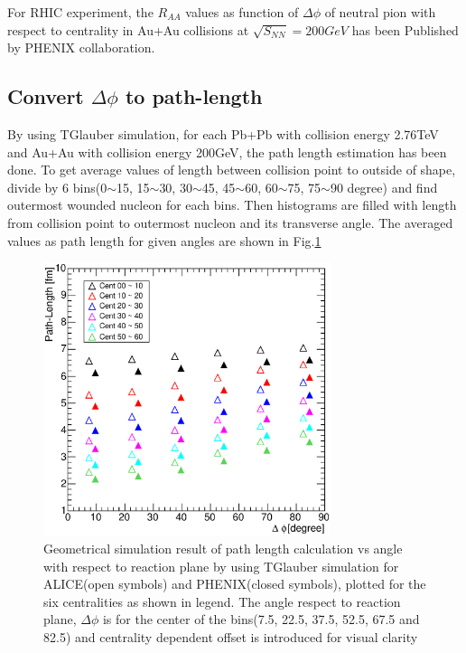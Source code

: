 For RHIC experiment, the $R_{AA}$ values as function of $\Delta \phi$ of neutral pion with respect to centrality in Au+Au collisions at $\sqrt{S_{NN}}= 200GeV$ has been Published by PHENIX collaboration. \cite{Adare:2012wg}


	\subsection{Convert $\Delta\phi$ to path-length}
	By using TGlauber simulation\cite{Alver:2008aq}, for each Pb+Pb with collision energy 2.76TeV and Au+Au with collision energy 200GeV, the path length estimation has been done. To get average values of length between collision point to outside of shape, divide by 6 bins(0$\sim$15, 15$\sim$30, 30$\sim$45, 45$\sim$60, 60$\sim$75, 75$\sim$90 degree) and find outermost wounded nucleon for each bins. Then histograms are filled with length from collision point to outermost nucleon and its transverse angle. The averaged values as path length for given angles are shown in Fig.\ref{apendfig3}

\begin{figure}[!h]
\begin{center}
\includegraphics[height=8cm]{figures/Fig_pathlength/fig9.eps}
\caption{Geometrical simulation result of path length calculation vs angle with respect to reaction plane by using TGlauber simulation for ALICE(open symbols) and PHENIX(closed symbols), plotted for the six centralities as shown in legend. The angle respect to reaction plane, $\Delta \phi$ is for the center of the bins(7.5, 22.5, 37.5, 52.5, 67.5 and 82.5) and centrality dependent offset is introduced for visual clarity }
\label{apendfig3}
\end{center}
\end{figure}

